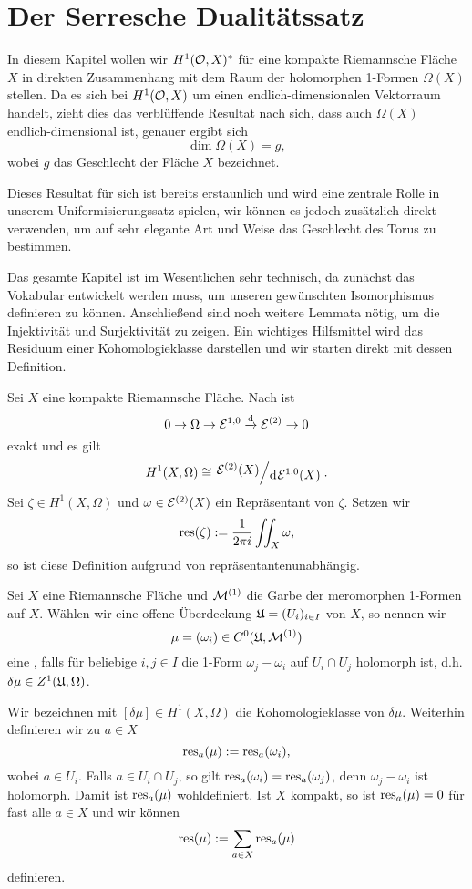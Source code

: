 \section{Der Serresche Dualitätssatz}
\label{sec:serre}

In diesem Kapitel wollen wir $H^1(\mathcal{O}, X)^\ast$ für eine kompakte
Riemannsche Fläche $X$ in direkten Zusammenhang mit dem Raum der
holomorphen 1-Formen $\Omega(X)$ stellen. Da es sich bei $H^1(\mathcal{O},
X)$ um einen endlich-dimensionalen Vektorraum handelt, zieht dies das
verblüffende Resultat nach sich, dass auch $\Omega(X)$
endlich-dimensional ist, genauer ergibt sich
\[
\dim \Omega(X) = g,
\]
wobei $g$ das Geschlecht der Fläche $X$ bezeichnet.

Dieses Resultat für sich ist bereits erstaunlich und wird eine
zentrale Rolle in unserem Uniformisierungssatz spielen, wir können es
jedoch zusätzlich direkt verwenden, um auf sehr elegante Art und Weise das
Geschlecht des Torus zu bestimmen.

Das gesamte Kapitel ist im Wesentlichen sehr technisch, da zunächst
das Vokabular entwickelt werden muss, um unseren gewünschten
Isomorphismus definieren zu können. Anschließend sind noch weitere
Lemmata nötig, um die Injektivität und Surjektivität zu
zeigen. Ein wichtiges Hilfsmittel wird das Residuum einer
Kohomologieklasse darstellen und wir starten direkt mit dessen Definition.

\begin{defin}
  \label{def:res}
  Sei $X$ eine kompakte Riemannsche Fläche. Nach \cite[Satz 15.14]{For} ist
  \[
  0 \ra \Omega \ra \diff^{1,0} \xrightarrow{\d} \diff^{(2)} \ra 0
  \]
  exakt und es gilt
  \[
  H^1(X, \Omega) \cong \quot{\diff^{(2)}(X)}{\d[\diff^{1,0}(X)]}.
  \]
  Sei $\zeta \in H^1(X,
  \Omega)$ und $\omega \in \mathcal{E}^{(2)}(X)$ ein Repräsentant von
  $\zeta$. Setzen wir
  \[
  \operatorname{res}(\zeta) := \frac{1}{2\pi i} \iint_X \omega,
  \]
  so ist diese Definition aufgrund von \cite[Satz 10.20]{For} repräsentantenunabhängig.
\end{defin}

\begin{defin}
  \label{def:mlv}
  Sei $X$ eine Riemannsche Fläche und $\mathcal{M}^{(1)}$ die Garbe der
  meromorphen 1-Formen auf $X$. Wählen wir eine offene Überdeckung
  $\mathfrak{U} = (U_i)_{i \in I}$ von $X$, so nennen wir
  \[
  \mu = (\omega_i) \in C^0( \mathfrak{U}, \mathcal{M}^{(1)})
  \]
  eine , falls für beliebige $i,j \in
  I$ die 1-Form $\omega_j - \omega_i$ auf $U_i \cap U_j$ holomorph
  ist, d.h. $ \delta \mu \in Z^1(\mathfrak{U}, \Omega)$.

  Wir bezeichnen mit $[\delta \mu] \in H^1(X, \Omega)$ die
  Kohomologieklasse von $\delta \mu$. Weiterhin definieren wir zu $a \in X$
  \[
  \operatorname{res}_a(\mu) := \operatorname{res}_a(\omega_i),
  \]
  wobei $a \in U_i$. Falls $a \in U_i \cap U_j$, so gilt
  $\operatorname{res}_a(\omega_i) = \operatorname{res}_a(\omega_j)$, denn $\omega_j - \omega_i$
  ist holomorph. Damit ist $\operatorname{res}_a(\mu)$ wohldefiniert. Ist $X$
  kompakt, so ist $\operatorname{res}_a(\mu) = 0$ für fast alle $a \in X$ und wir können
  \[
  \operatorname{res}(\mu) := \sum_{a \in X} \operatorname{res}_a(\mu)
  \]
  definieren.
\end{defin}

